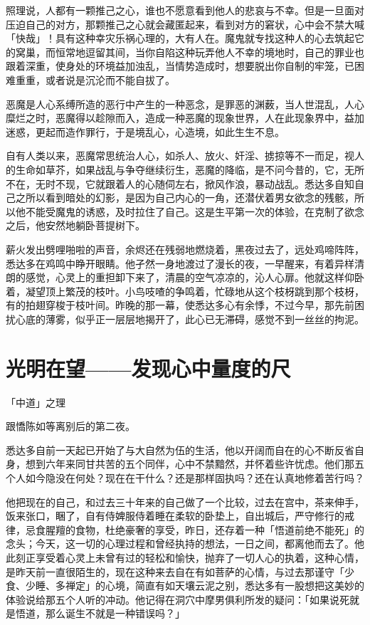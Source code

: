 \documentclass[12pt,twoside,openany]{book}
\begin{document}
照理说，人都有一颗推己之心，谁也不愿意看到他人的悲哀与不幸。但是一旦面对压迫自己的对方，那颗推己之心就会藏匿起来，看到对方的窘状，心中会不禁大喊「快哉」！具有这种幸灾乐祸心理的，大有人在。魔鬼就专找这种人的心去筑起它的窝巢，而恒常地逗留其间，当你自陷这种玩弄他人不幸的境地时，自己的罪业也跟着深重，使身处的环境益加浊乱，当情势造成时，想要脱出你自制的牢笼，已困难重重，或者说是沉沦而不能自拔了。

恶魔是人心系缚所造的恶行中产生的一种恶念，是罪恶的渊薮，当人世混乱，人心糜烂之时，恶魔得以趁隙而入，造成一种恶魔的现象世界，人在此现象界中，益加迷惑，更起而造作罪行，于是境乱心，心造境，如此生生不息。

自有人类以来，恶魔常思统治人心，如杀人、放火、奸淫、掳掠等不一而足，视人的生命如草芥，如果战乱与争夺继续衍生，恶魔的降临，是不问今昔的，它，无所不在，无时不现，它就跟着人的心随伺左右，掀风作浪，暴动战乱。悉达多自知自己之所以看到暗处的幻影，是因为自己内心的一角，还潜伏着男女欲念的残骸，所以他不能受魔鬼的诱惑，及时拉住了自己。这是生平第一次的体验，在克制了欲念之后，他安然地躺卧菩提树下。

薪火发出劈哩啪啦的声音，余烬还在残弱地燃烧着，黑夜过去了，远处鸡啼阵阵，悉达多在鸡鸣中睁开眼睛。他孑然一身地渡过了漫长的夜，一早醒来，有着异样清朗的感觉，心灵上的重担卸下来了，清晨的空气凉凉的，沁人心扉。他就这样仰卧着，凝望顶上繁茂的枝叶。小鸟吱喳的争鸣着，忙碌地从这个枝枒跳到那个枝枒，有的拍翅穿梭于枝叶间。昨晚的那一幕，使悉达多心有余悸，不过今早，那先前困扰心底的薄雾，似乎正一层层地揭开了，此心已无滞碍，感觉不到一丝丝的拘泥。

\section{光明在望——发现心中量度的尺}\label{sec1.11}

「中道」之理

跟憍陈如等离别后的第二夜。

悉达多自前一天起已开始了与大自然为伍的生活，他以开阔而自在的心不断反省自身，想到六年来同甘共苦的五个同伴，心中不禁黯然，并怀着些许忧虑。他们那五个人如今隐没在何处？现在在干什么？还是那样固执吗？还在认真地修着苦行吗？

他把现在的自己，和过去三十年来的自己做了一个比较，过去在宫中，茶来伸手，饭来张口，睏了，自有侍婢服侍着睡在柔软的卧垫上，自出城后，严守修行的戒律，忌食腥羶的食物，杜绝豪奢的享受，昨日，还存着一种「悟道前绝不能死」的念头；今天，这一切的心理过程和曾经执持的想法，一日之间，都离他而去了。他此刻正享受着心灵上未曾有过的轻松和愉快，抛弃了一切人心的执着，这种心情，是昨天前一直很陌生的，现在这种来去自在有如菩萨的心情，与过去那谨守「少食、少睡、多禅定」的心境，简直有如天壤云泥之别，悉达多有一股想把这美妙的体验说给那五个人听的冲动。他记得在洞穴中摩男俱利所发的疑问：「如果说死就是悟道，那么诞生不就是一种错误吗？」
\end{document}
